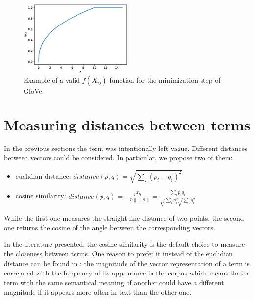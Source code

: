 \begin{figure}[h]
    \centering
    \includegraphics[width=0.5\textwidth]{images/glovef}
    \caption{Example of a valid $f(X_{ij})$ function for the minimization step of GloVe.}
    \label{fig:glovef}
\end{figure}

\section{Measuring distances between terms}
In the previous sections the term  was intentionally left vague.
Different distances between vectors could be considered.
In particular, we propose two of them:
\begin{itemize}
    \item euclidian distance: $distance(p, q) = \sqrt{\sum_i (p_i - q_i)^2}$
    \item cosine similarity: $distance(p, q) = \frac{p^T q}{\left\lVert p \right\rVert \left\lVert q \right\rVert} = \frac{\sum_i p_i q_i}{\sqrt{\sum_i p_i^2} \sqrt{\sum_i q_i^2}}$
\end{itemize}

While the first one measures the straight-line distance of two points, the second one returns the cosine of the angle between the corresponding vectors.

In the literature presented, the cosine similarity is the default choice to measure the closeness between terms.
One reason to prefer it instead of the euclidian distance
can be found in \cite{DBLP:journals/corr/SchakelW15}: the magnitude of the vector representation of a term
is correlated with the frequency of its appearance in the corpus which means that
a term with the same semantical meaning of another could have a different
magnitude if it appears more often in text than the other one.